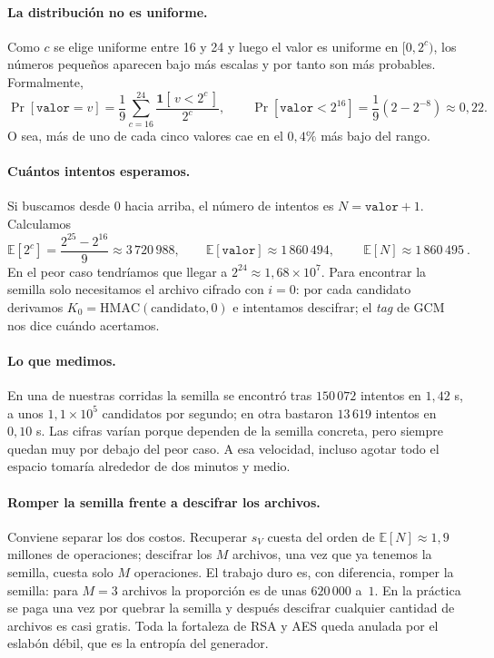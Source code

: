 \documentclass[11pt,a4paper]{article}
\begin{document}
\paragraph{La distribución no es uniforme.} Como $c$ se elige uniforme entre 16 y
24 y luego el valor es uniforme en $[0,2^c)$, los números pequeños aparecen bajo
más escalas y por tanto son más probables. Formalmente,
\[
\Pr[\texttt{valor}=v]=\frac{1}{9}\sum_{c=16}^{24}\frac{\mathbf{1}[\,v<2^{c}\,]}{2^{c}},
\qquad
\Pr[\texttt{valor}<2^{16}]=\frac{1}{9}\left(2-2^{-8}\right)\approx 0{,}22 .
\]
O sea, más de uno de cada cinco valores cae en el $0{,}4\%$ más bajo del rango.

\paragraph{Cuántos intentos esperamos.} Si buscamos desde $0$ hacia arriba, el
número de intentos es $N=\texttt{valor}+1$. Calculamos
\[
\mathbb{E}[2^{c}]=\frac{2^{25}-2^{16}}{9}\approx 3\,720\,988,
\qquad
\mathbb{E}[\texttt{valor}]\approx 1\,860\,494,
\qquad
\boxed{\ \mathbb{E}[N]\approx 1\,860\,495\ }.
\]
En el peor caso tendríamos que llegar a $2^{24}\approx 1{,}68\times10^{7}$. Para
encontrar la semilla solo necesitamos el archivo cifrado con $i=0$: por cada
candidato derivamos $K_0=\mathrm{HMAC}(\text{candidato},0)$ e intentamos descifrar;
el \emph{tag} de GCM nos dice cuándo acertamos.

\paragraph{Lo que medimos.} En una de nuestras corridas la semilla se encontró
tras $150\,072$ intentos en $1{,}42$ s, a unos $1{,}1\times10^5$ candidatos por
segundo; en otra bastaron $13\,619$ intentos en $0{,}10$ s. Las cifras varían
porque dependen de la semilla concreta, pero siempre quedan muy por debajo del
peor caso. A esa velocidad, incluso agotar todo el espacio tomaría alrededor de
dos minutos y medio.

\paragraph{Romper la semilla frente a descifrar los archivos.} Conviene separar
los dos costos. Recuperar $s_V$ cuesta del orden de $\mathbb{E}[N]\approx 1{,}9$
millones de operaciones; descifrar los $M$ archivos, una vez que ya tenemos la
semilla, cuesta solo $M$ operaciones. El trabajo duro es, con diferencia, romper
la semilla: para $M=3$ archivos la proporción es de unas $620\,000$ a~$1$. En la
práctica se paga una vez por quebrar la semilla y después descifrar cualquier
cantidad de archivos es casi gratis. Toda la fortaleza de RSA y AES queda anulada
por el eslabón débil, que es la entropía del generador.
\end{document}
